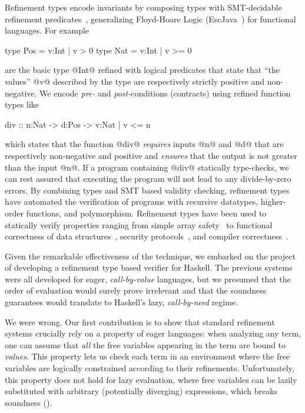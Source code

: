 %
Refinement types encode invariants
by composing types with SMT-decidable refinement 
predicates~\cite{Rushby98,pfenningxi98},
generalizing Floyd-Hoare Logic 
(\eg EscJava~\cite{ESCJava})
for functional languages.
%
For example
%
\begin{code}
   type Pos = {v:Int | v >  0}
   type Nat = {v:Int | v >= 0}
\end{code}
%
are the basic type @Int@ refined with logical predicates 
that state that ``the values'' @v@ described by the type 
are respectively strictly positive and non-negative.
%
We encode \emph{pre-} and \emph{post-}conditions (contracts) using 
refined function types like 
%
\begin{code}
   div :: n:Nat -> d:Pos -> {v:Nat | v <= n}
\end{code}
%
which states that the function @div@ \emph{requires} inputs @n@ and @d@ that are 
respectively non-negative and positive and \emph{ensures} that the 
output is not greater than the input @n@.
If a program containing @div@ statically type-checks, we can rest assured that
executing the program will not lead to any divide-by-zero errors.
%
By combining types and SMT based validity checking,
refinement types have automated the verification of 
programs with recursive datatypes, higher-order 
functions, and polymorphism.
%
Refinement types have been used to statically 
verify properties ranging from simple array safety~\cite{pfenningxi98,LiquidPLDI08}
to functional correctness of data structures~\cite{LiquidPLDI09}, 
security protocols~\cite{GordonTOPLAS2011},  
and compiler correctness~\cite{fstar}.

Given the remarkable effectiveness of the technique, 
we embarked on the project of developing a refinement 
type based verifier for  Haskell.
The previous systems were all developed for eager, 
\emph{call-by-value} languages, but we presumed that
the order of evaluation would surely prove irrelevant
and that the soundness guarantees would translate 
to Haskell's lazy, \emph{call-by-need} regime.

We were wrong.
%
Our first contribution is to show that standard refinement 
systems crucially rely on a property of eager languages:
%
when analyzing any term, one can assume that \emph{all} the
free variables appearing in the term are bound to \emph{values}.
This property lets us check each term in an environment where 
the free variables are logically constrained according to 
their refinements.
%
Unfortunately, this property does not hold for lazy evaluation, 
where free variables can be lazily substituted with arbitrary 
(potentially diverging) expressions, which breaks 
soundness ().

